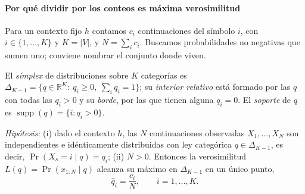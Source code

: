 \paragraph{Por qué dividir por los conteos es máxima verosimilitud}
Para un contexto fijo $h$ contamos $c_i$ continuaciones del símbolo $i$, con
$i\in\{1,\ldots,K\}$ y $K=|V|$, y $N=\sum_ic_i$. Buscamos probabilidades no
negativas que sumen uno; conviene nombrar el conjunto donde viven.
\begin{definicion}\label{s01:def:simplex}
El \emph{símplex} de distribuciones sobre $K$ categorías es
$\Delta_{K-1}=\{q\in\mathbb R^K:\ q_i\ge0,\ \sum_iq_i=1\}$; su
\emph{interior relativo} está formado por las $q$ con todas las $q_i>0$ y su
\emph{borde}, por las que tienen alguna $q_i=0$. El \emph{soporte} de $q$ es
$\operatorname{supp}(q)=\{i:q_i>0\}$.
\end{definicion}
\begin{proposicion}\label{s01:prop:mle}
\emph{Hipótesis:} (i) dado el contexto $h$, las $N$ continuaciones observadas
$X_1,\ldots,X_N$ son independientes e idénticamente distribuidas con ley
categórica $q\in\Delta_{K-1}$, es decir, $\Pr(X_s=i\mid q)=q_i$;
(ii) $N>0$. Entonces la verosimilitud $L(q)=\Pr(x_{1:N}\mid q)$ alcanza su máximo
en $\Delta_{K-1}$ en un único punto,
\[
\boxed{\widehat q_i=\frac{c_i}{N},\qquad i=1,\ldots,K.}
\]
\end{proposicion}
